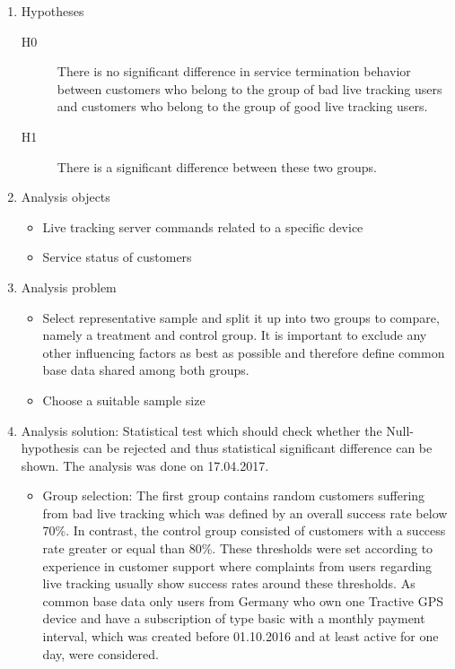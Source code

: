 \begin{enumerate}
	\item Hypotheses
	\begin{description}
		\item[H0] There is no significant difference in service termination behavior between customers who belong to the group of bad live tracking users and customers who belong to the group of good live tracking users.
		\item[H1] There is a significant difference between these two groups.
	\end{description}
	\item Analysis objects
	\begin{itemize}
		\item Live tracking server commands related to a specific device
		\item Service status of customers
	\end{itemize}
	\item Analysis problem
	\begin{itemize}
		\item Select representative sample and split it up into two groups to compare, namely a treatment and control group. It is important to exclude any other influencing factors as best as possible and therefore define common base data shared among both groups. 
		\item Choose a suitable sample size
	\end{itemize}
	\item Analysis solution: Statistical test which should check whether the Null-hypothesis can be rejected and thus statistical significant difference can be shown. The analysis was done on 17.04.2017. 
	\begin{itemize}
		\item Group selection: The first group contains random customers suffering from bad live tracking which was defined by an overall success rate below 70\%. In contrast, the control group consisted of customers with a success rate greater or equal than 80\%. These thresholds were set according to experience in customer support where complaints from users regarding live tracking usually show success rates around these thresholds. As common base data only users from Germany who own one Tractive GPS device and have a subscription of type basic with a monthly payment interval, which was created before 01.10.2016 and at least active for one day, were considered. 

\end{itemize}
\end{enumerate}
